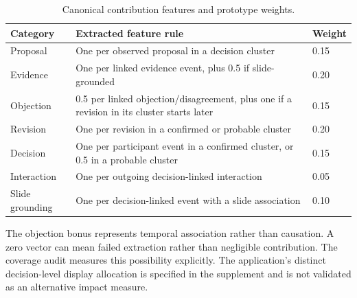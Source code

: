 \documentclass[journal]{IEEEtran}
\begin{document}
\begin{table}[t]
\caption{Canonical contribution features and prototype weights.}
\label{tab:2}
\centering\footnotesize
\setlength{\tabcolsep}{3pt}
\renewcommand{\arraystretch}{1.13}
\begin{tabular}{p{}p{}p{}}
\toprule
{\raggedright Category\par} & {\raggedright Extracted feature rule\par} & {\raggedright Weight\par} \\
\midrule
{\raggedright Proposal\par} & {\raggedright One per observed proposal in a decision cluster\par} & {\raggedright 0.15\par} \\
{\raggedright Evidence\par} & {\raggedright One per linked evidence event, plus 0.5 if slide-grounded\par} & {\raggedright 0.20\par} \\
{\raggedright Objection\par} & {\raggedright 0.5 per linked objection/disagreement, plus one if a revision in its cluster starts later\par} & {\raggedright 0.15\par} \\
{\raggedright Revision\par} & {\raggedright One per revision in a confirmed or probable cluster\par} & {\raggedright 0.20\par} \\
{\raggedright Decision\par} & {\raggedright One per participant event in a confirmed cluster, or 0.5 in a probable cluster\par} & {\raggedright 0.15\par} \\
{\raggedright Interaction\par} & {\raggedright One per outgoing decision-linked interaction\par} & {\raggedright 0.05\par} \\
{\raggedright Slide grounding\par} & {\raggedright One per decision-linked event with a slide association\par} & {\raggedright 0.10\par} \\
\bottomrule
\end{tabular}
\end{table}
The objection bonus represents temporal association rather than causation. A zero vector can mean failed extraction rather than negligible contribution. The coverage audit measures this possibility explicitly. The application's distinct decision-level display allocation is specified in the supplement and is not validated as an alternative impact measure.
\end{document}
